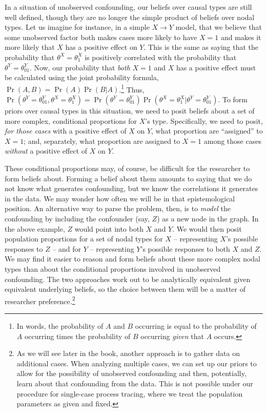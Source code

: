 \documentclass[
  12pt,
]{book}
\begin{document}
In a situation of unobserved confounding, our beliefs over causal types are still well defined, though they are no longer the simple product of beliefs over nodal types. Let us imagine for instance, in a simple \(X \rightarrow Y\) model, that we believe that some unobserved factor both makes cases more likely to have \(X = 1\) and makes it more likely that \(X\) has a positive effect on \(Y\). This is the same as saying that the probability that \(\theta^X = \theta^X_1\) is positively correlated with the probability that \(\theta^Y = \theta^Y_{01}\). Now, our probability that \emph{both} \(X=1\) and \(X\) has a positive effect must be calculated using the joint probability formula, \(\Pr(A, B) = \Pr(A)\Pr(B|A)\).\footnote{In words, the probability of \(A\) and \(B\) occurring is equal to the probability of \(A\) occurring times the probability of \(B\) occurring \emph{given} that \(A\) occurs.} Thus, \(\Pr(\theta^Y = \theta^Y_{01}, \theta^X = \theta^X_1) = \Pr(\theta^Y = \theta^Y_{01})\Pr(\theta^X = \theta^X_1 | \theta^Y = \theta^Y_{01})\). To form priors over causal types in this situation, we need to posit beliefs about a set of more complex, conditional proportions for \(X\)'s type. Specifically, we need to posit, \emph{for those cases} with a positive effect of \(X\) on \(Y\), what proportion are ``assigned'' to \(X=1\); and, separately, what proportion are assigned to \(X=1\) among those cases \emph{without} a positive effect of \(X\) on \(Y\).

These conditional proportions may, of course, be difficult for the researcher to form beliefs about. Forming a belief about them amounts to saying that we do not know what generates confounding, but we know the correlations it generates in the data. We may wonder how often we will be in that epistemological position. An alternative way to parse the problem, then, is to \emph{model} the confounding by including the confounder (say, \(Z\)) as a new node in the graph. In the above example, \(Z\) would point into both \(X\) and \(Y\). We would then posit population proportions for a set of nodal types for \(X\) -- representing \(X\)'s possible responses to \(Z\) -- and for \(Y\) -- representing \(Y\)'s possible responses to both \(X\) and \(Z\). We may find it easier to reason and form beliefs about these more complex nodal types than about the conditional proportions involved in unobserved confounding. The two approaches work out to be analytically equivalent given equivalent underlying beliefs, so the choice between them will be a matter of researcher preference.\footnote{As we will see later in the book, another approach is to gather data on additional cases. When analyzing multiple cases, we can set up our priors to allow for the possibility of unobserved confounding and then, potentially, learn about that confounding from the data. This is not possible under our procedure for single-case process tracing, where we treat the population parameters as given and fixed.}
\end{document}
